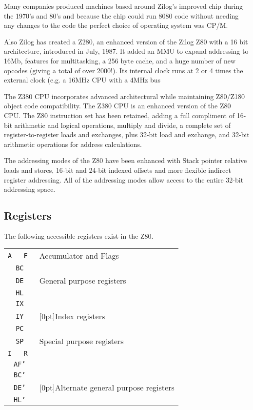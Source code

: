 \documentclass[twoside,openright,a4paper]{book}
\begin{document}
Many companies produced machines based around Zilog's improved chip during the 1970's and 80's and because the chip could run 8080 code without needing any changes to the code the perfect choice of operating system was CP/M. 

Also Zilog has created a Z280, an enhanced version of the Zilog Z80 with a 16 bit architecture, introduced in July, 1987. It added an MMU to expand addressing to 16Mb, features for multitasking, a 256 byte cache, and a huge number of new opcodes (giving a total of over 2000!). Its internal clock runs at 2 or 4 times the external clock (e.g. a 16MHz CPU with a 4MHz bus

The Z380 CPU incorporates advanced architectural while maintaining Z80/Z180 object code compatibility. The Z380 CPU is an enhanced version of the Z80 CPU. The Z80 instruction set has been retained, adding a full compliment of 16-bit arithmetic and logical operations, multiply and divide, a complete set of register-to-register loads and exchanges, plus 32-bit load and exchange, and 32-bit arithmetic operations for address calculations.

The addressing modes of the Z80 have been enhanced with Stack pointer relative loads and stores, 16-bit and 24-bit indexed offsets and more flexible indirect register addressing. All of the addressing modes allow access to the entire 32-bit addressing space.


\subsection{Registers}

The following accessible registers exist in the Z80.

\begin{tabular}{|c|c|l}
	\cline{1-2}
	\tt A & \tt F & Accumulator and Flags \\ \cline{1-2} \cline{1-2}
	\multicolumn{2}{|c|}{\tt BC} & \\ \cline{1-2}
	\multicolumn{2}{|c|}{\tt DE} & General purpose registers \\ \cline{1-2}
	\multicolumn{2}{|c|}{\tt HL} & \\ \cline{1-2}
	\multicolumn{2}{|c|}{\tt IX} & \\ \cline{1-2}
	\multicolumn{2}{|c|}{\tt IY} & \raisebox{1.5ex}[0pt]{Index registers} \\ \cline{1-2}
	\multicolumn{2}{|c|}{\tt PC} & \\ \cline{1-2}
	\multicolumn{2}{|c|}{\tt SP} & Special purpose registers \\ \cline{1-2}
	\tt I & \tt R & \\ \cline{1-2}
	\multicolumn{2}{|c|}{\tt AF'} & \\ \cline{1-2}
	\multicolumn{2}{|c|}{\tt BC'} & \\ \cline{1-2}
	\multicolumn{2}{|c|}{\tt DE'} & \raisebox{1.5ex}[0pt]{Alternate general purpose registers}\\ \cline{1-2}
	\multicolumn{2}{|c|}{\tt HL'} & \\ \cline{1-2}
\end{tabular}
\end{document}
